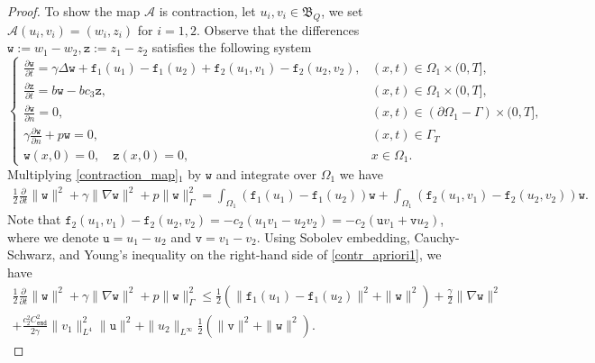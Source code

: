 \documentclass[11pt]{article}
\begin{document}
\begin{proof}
To show the map $\mathcal{A}$ is contraction, let $u_i, v_i \in \mathfrak{B}_Q$, we set $\mathcal{A}(u_i, v_i)=(w_i, z_i)$ for $i=1, 2$. Observe that the differences $\mathtt{w}:=w_1 - w_2, \mathtt{z}:=z_1 - z_2$ satisfies the following system
\begin{equation}\label{contraction_map}
\begin{cases}
\frac{\partial \mathtt{w}}{\partial t}  = \gamma \Delta \mathtt{w} + \mathtt{f}_1(u_1) -\mathtt{f}_1(u_2) + \mathtt{f}_2(u_1, v_1)-\mathtt{f}_2(u_2, v_2), & (x,t)\in\Omega_1\times(0,T],\\
\frac{\partial \mathtt{z}}{\partial t} = b\mathtt{w} - bc_3\mathtt{z} , & (x,t)\in\Omega_1\times(0,T],\\
\frac{\partial \mathtt{w}}{\partial n}=0, & (x,t)\in\left(\partial\Omega_1 - \Gamma\right)\times(0,T],\\
\gamma\frac{\partial \mathtt{w}}{\partial n} + p\mathtt{w}
 = 0,  & (x,t)\in\Gamma_T\\
\mathtt{w}(x,0)=0, \quad 
\mathtt{z}(x,0)=0, & x\in \Omega_1.
\end{cases}
\end{equation}
Multiplying \eqref{contraction_map}$_1$ by $\mathtt{w}$ and integrate over $\Omega_1$ we have 
\begin{equation}\label{contr_apriori1}
\begin{aligned}
\frac{1}{2}\frac{\partial}{\partial t}\parallel \mathtt{w}\parallel^2 + \gamma \parallel\nabla \mathtt{w} \parallel^2 + p \parallel \mathtt{w} \parallel^2_{\Gamma}  =  
\int_{\Omega_1} \left( \mathtt{f}_1(u_1) -\mathtt{f}_1(u_2)\right) \mathtt{w}  + \int_{\Omega_1} \left( \mathtt{f}_2(u_1, v_1) -\mathtt{f}_2(u_2, v_2) \right) \mathtt{w}.
\end{aligned}
\end{equation}
Note that $\mathtt{f}_2(u_1, v_1) -\mathtt{f}_2(u_2, v_2) =-c_2( u_1v_1 - u_2v_2)=-c_2(\mathtt{u}v_1 + \mathtt{v}u_2)$, where we denote $\mathtt{u}=u_1-u_2$ and $\mathtt{v}=v_1-v_2$. Using Sobolev embedding, Cauchy-Schwarz, and Young's inequality on the right-hand side of \eqref{contr_apriori1}, we have 
\begin{multline}\label{contr_apriori2}
\frac{1}{2}\frac{\partial}{\partial t}\parallel \mathtt{w}\parallel^2 + \gamma \parallel\nabla \mathtt{w} \parallel^2 + p \parallel \mathtt{w} \parallel^2_{\Gamma}  \leq   
\frac{1}{2}\left( \parallel \mathtt{f}_1(u_1) -\mathtt{f}_1(u_2)\parallel^2 + \parallel \mathtt{w}\parallel^2\right) +\frac{\gamma}{2} \parallel\nabla \mathtt{w} \parallel^2\\ + \frac{c_2^2 C_{\texttt{emd}}^2}{2\gamma}\parallel v_1\parallel_{L^{4}}^2  \parallel \mathtt{u}\parallel^2 +\parallel u_2\parallel_{L^{\infty}}\frac{1}{2} \left( \parallel \mathtt{v}\parallel^2 +\parallel \mathtt{w}\parallel^2 \right).

\end{multline}
\end{proof}
\end{document}
